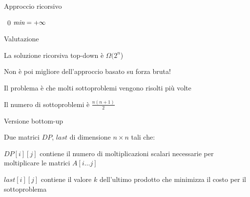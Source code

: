 \begin{frame}{Approccio ricorsivo}

\vspace{-6pt}
\begin{Procedure}
\caption[A]{\INTEGER {}($\INTEGER[\,]\ c$, \INTEGER $i$, \INTEGER $j$)}
{ \Return\ $0$\; }
{
  $\textit{min} = +\infty$\;
  \Return \Min\;
}
\end{Procedure}


\end{frame}

\begin{frame}{Valutazione}

\vspace{-6pt}
\BIL
\item La soluzione ricorsiva top-down è $\Omega(2^n$)
\item Non è poi migliore dell'approccio basato su forza bruta!
\item Il problema è che molti sottoproblemi vengono risolti più volte
\item Il numero di sottoproblemi è $\frac{n(n+1)}{2}$
\EIL

\end{frame}

\begin{frame}{Versione bottom-up}

\vspace{-6pt}
\begin{myboxtitle}
Due matrici $DP$, $\mathit{last}$ di dimensione $n \times n$ tali che:
\BIL
\item $DP[i][j]$ contiene il numero di moltiplicazioni scalari necessarie
per moltiplicare le matrici $A[i \ldots j]$
\item $\mathit{last}[i][j]$ contiene il valore $k$ dell'ultimo prodotto che minimizza il costo per il sottoproblema
\EIL
\end{myboxtitle}
\end{frame}

